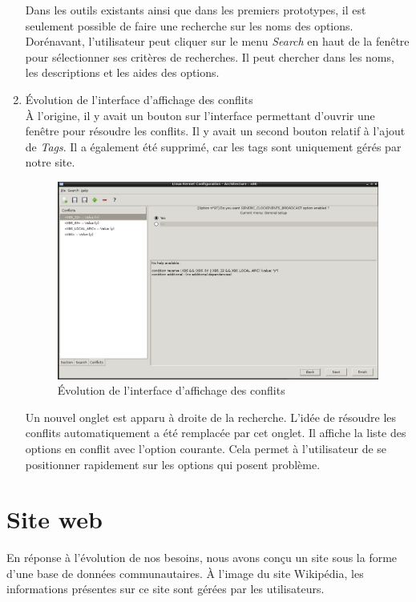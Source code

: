 ﻿\documentclass[17pts]{report}
\begin{document}
\begin{enumerate}
    Dans les outils existants ainsi que dans les premiers prototypes, il est
    seulement possible de faire une recherche sur les noms des options.
    Dorénavant, l'utilisateur peut cliquer sur le menu \textit{Search} en haut
    de la fenêtre pour sélectionner ses critères de recherches. Il peut chercher
    dans les noms, les descriptions et les aides des options.

    \pagebreak

    \item Évolution de l'interface d'affichage des conflits \\

    À l'origine, il y avait un bouton sur l'interface permettant d'ouvrir une
    fenêtre pour résoudre les conflits. Il y avait un second bouton relatif à
    l'ajout de \textit{Tags}. Il a également été supprimé, car les tags sont
    uniquement gérés par notre site.

    \begin{figure}[H]
        \includegraphics[scale=0.5]{./illustrations/screen_options_conflits_interface.png}
        \centering
        \caption{Évolution de l'interface d'affichage des conflits}
        \label{fig:Evo_affichage_conflits}
    \end{figure}

    Un nouvel onglet est apparu à droite de la recherche. L'idée de résoudre
    les conflits automatiquement a été remplacée par cet onglet. Il affiche la
    liste des options en conflit avec l'option courante. Cela permet à
    l'utilisateur de se positionner rapidement sur les options qui posent
    problème.
\end{enumerate}

\newpage
\section{Site web}
\label{sec:Site web}
En réponse à l'évolution de nos besoins, nous avons conçu un site sous la forme
d'une base de données communautaires. À l'image du site Wikipédia, les
informations présentes sur ce site sont gérées par les utilisateurs.\\
\end{document}

